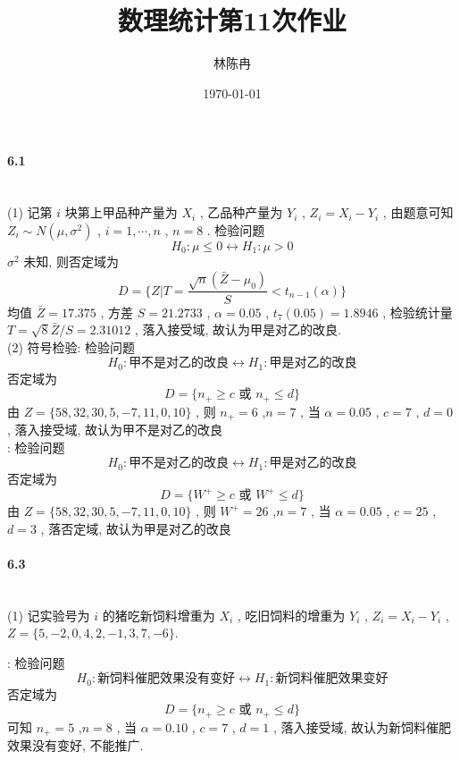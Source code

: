 \documentclass[UTF8]{ctexart}
\title{数理统计第11次作业}
\author{林陈冉}
\date{\today}
\begin{document}
    \maketitle
    \paragraph{6.1}\quad\\
        \noindent(1) 记第 $i$ 块第上甲品种产量为 $X_i$ , 乙品种产量为 $Y_i$ , $Z_i=X_i-Y_i$ , 由题意可知 $Z_i\sim N(\mu, \sigma^2)$ , $i=1, \cdots, n$ , $n=8$ . 检验问题
        \[H_0:\mu \le 0 \leftrightarrow H_1:\mu > 0\]
        $\sigma^2$ 未知, 则否定域为 
        \[D=\{Z|T=\frac{\sqrt{n}(\bar{Z}-\mu_0)}{S}<t_{n-1}(\alpha)\}\]
        均值 $\bar{Z}=17.375$ , 方差 $S=21.2733$ , $\alpha=0.05$ , $t_{7}(0.05)=1.8946$ , 检验统计量 $T=\sqrt{8}\bar{Z}/S=2.31012$ ,
        落入接受域, 故认为甲是对乙的改良.\\

        \noindent(2) 符号检验: 检验问题
        \[H_0 : \text{甲不是对乙的改良} \leftrightarrow H_1 : \text{甲是对乙的改良}\]
        否定域为
        \[D=\{n_+ \ge c \text{ 或 } n_+ \le d\}\]
        由 $Z = \{58, 32, 30, 5, -7, 11, 0, 10\}$ , 则 $n_+ = 6$ ,$n = 7$ , 当 $\alpha = 0.05$ , $c = 7$ , $d = 0$ ,
        落入接受域, 故认为甲不是对乙的改良\\

        : 检验问题
        \[H_0 : \text{甲不是对乙的改良} \leftrightarrow H_1 : \text{甲是对乙的改良}\]
        否定域为
        \[D=\{W^+ \ge c \text{ 或 } W^+ \le d\}\]
        由 $Z = \{58, 32, 30, 5, -7, 11, 0, 10\}$ , 则 $W^+ = 26$ ,$n = 7$ , 当 $\alpha = 0.05$ , $c = 25$ , $d = 3$ ,
        落否定域, 故认为甲是对乙的改良\\
     
     \paragraph{6.3}\quad\\
        \noindent(1) 记实验号为 $i$ 的猪吃新饲料增重为 $X_i$ , 吃旧饲料的增重为 $Y_i$ , $Z_i=X_i-Y_i$ , $Z=\{5,-2,0,4,2,-1,3,7,-6\}$.

        : 检验问题
        \[H_0 : \text{新饲料催肥效果没有变好} \leftrightarrow H_1 : \text{新饲料催肥效果变好}\]
        否定域为
        \[D=\{n_+ \ge c \text{ 或 } n_+ \le d\}\]
        可知 $n_+ = 5$ ,$n = 8$ , 当 $\alpha = 0.10$ , $c = 7$ , $d = 1$ ,
        落入接受域, 故认为新饲料催肥效果没有变好, 不能推广.\\
\end{document}

